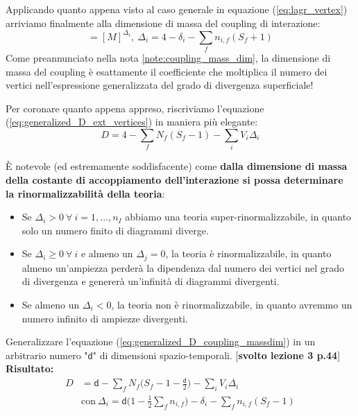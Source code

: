 \documentclass[../main.tex]{subfiles}
\begin{document}
Applicando quanto appena visto al caso generale in equazione (\ref{eq:lagr_vertex}) arriviamo finalmente alla dimensione di massa del coupling di interazione:
\begin{equation}
[\mathsf g_i] = [M]^{\Delta_i},~ \Delta_i=4-\delta_i-\sum_f n_{i,f}(S_f+1)
\label{eq:coupling_mass_dim}
\end{equation}
Come preannunciato nella nota \ref{note:coupling_mass_dim}, la dimensione di massa del coupling è esattamente il coefficiente che moltiplica il numero dei vertici nell'espressione generalizzata del grado di divergenza superficiale!

Per coronare quanto appena appreso, riscriviamo l'equazione (\ref{eq:generalized_D_ext_vertices}) in maniera più elegante:
\begin{equation}
    D = 4 - \sum_f N_f(S_f-1) - \sum_i V_i \Delta_i
    \label{eq:generalized_D_coupling_massdim}
\end{equation}

È notevole (ed estremamente soddisfacente) come \textbf{dalla dimensione di massa della costante di accoppiamento dell'interazione si possa determinare la rinormalizzabilità della teoria}:
\begin{itemize}
    \item Se $\Delta_i>0 ~\forall ~ i = 1,...,n_I$ abbiamo una teoria super-rinormalizzabile, in quanto solo un numero finito di diagrammi diverge.
    \item Se $\Delta_i \geq 0 ~\forall ~ i$ e almeno un $\Delta_j = 0$, la teoria è rinormalizzabile, in quanto almeno un'ampiezza perderà la dipendenza dal numero dei vertici nel grado di divergenza e genererà un'infinità di diagrammi divergenti.
    \item Se almeno un $\Delta_i < 0$, la teoria non è rinormalizzabile, in quanto avremmo un numero infinito di ampiezze divergenti.
\end{itemize}

\begin{exercise}
    Generalizzare l'equazione (\ref{eq:generalized_D_coupling_massdim}) in un arbitrario numero "$\mathsf{d}$" di dimensioni spazio-temporali. [\textbf{svolto lezione 3 p.44}]\\
    
    \textbf{Risultato:}
    \begin{equation}
    \boxed{
    \begin{aligned}
    D &= \mathsf{d} - \sum_f N_f\bigg(S_f - 1 - \frac{\mathsf{d}}{2}\bigg) - \sum_i V_i \Delta_i \\
      &\text{con}~\Delta_i = \mathsf{d}\bigg(1-\frac{1}{2}\sum_f n_{i,f}\bigg)- \delta_i - \sum_f  n_{i,f}(S_f-1)
    \end{aligned}
    }
    \label{eq:ex142_sol}
    \end{equation}
\end{exercise}
\end{document}
